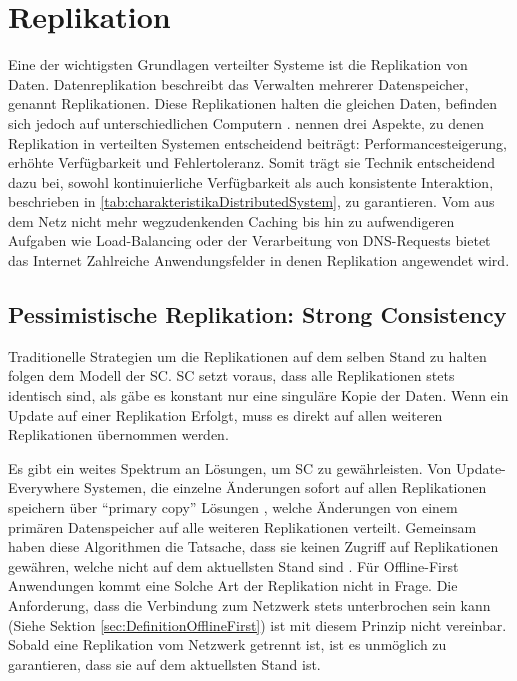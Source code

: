 \documentclass[a4paper, 12pt]{scrreprt}
\begin{document}
\section{Replikation}

Eine der wichtigsten Grundlagen verteilter Systeme ist die Replikation von Daten. Datenreplikation beschreibt das Verwalten mehrerer Datenspeicher, genannt Replikationen. Diese Replikationen halten die gleichen Daten, befinden sich jedoch auf unterschiedlichen Computern \autocite[S.42]{ArticleOptimisticReplication}. \citet{BookDistributedSystemsConceptsAndDesign} nennen drei Aspekte, zu denen Replikation in verteilten Systemen entscheidend beiträgt: Performancesteigerung, erhöhte Verfügbarkeit und Fehlertoleranz. Somit trägt sie Technik entscheidend dazu bei, sowohl kontinuierliche Verfügbarkeit als auch konsistente Interaktion, beschrieben in \ref{tab:charakteristikaDistributedSystem}, zu garantieren. Vom aus dem Netz nicht mehr wegzudenkenden Caching bis hin zu aufwendigeren Aufgaben wie Load-Balancing oder der Verarbeitung von DNS-Requests bietet das Internet Zahlreiche Anwendungsfelder in denen Replikation angewendet wird. 

\subsection{Pessimistische Replikation: Strong Consistency}

Traditionelle Strategien um die Replikationen auf dem selben Stand zu halten folgen dem Modell der \ac{SC}. \ac{SC} setzt voraus, dass alle Replikationen stets identisch sind, als gäbe es konstant nur eine singuläre Kopie der Daten. Wenn ein Update auf einer Replikation Erfolgt, muss es direkt auf allen weiteren Replikationen übernommen werden. 

Es gibt ein weites Spektrum an Lösungen, um \ac{SC} zu gewährleisten. Von {Update-Everywhere} Systemen, die einzelne Änderungen sofort auf allen Replikationen speichern \autocite{ThesisUpdateEverywhere} über \enquote{primary copy} Lösungen \autocite[S.14]{BookPrimaryReplica}, welche Änderungen von einem primären Datenspeicher auf alle weiteren Replikationen verteilt. Gemeinsam haben diese Algorithmen die Tatsache, dass sie keinen Zugriff auf Replikationen gewähren, welche nicht auf dem aktuellsten Stand sind \autocite[S.43]{ArticleOptimisticReplication}. Für Offline-First Anwendungen kommt eine Solche Art der Replikation nicht in Frage. Die Anforderung, dass die Verbindung zum Netzwerk stets unterbrochen sein kann (Siehe Sektion \ref{sec:DefinitionOfflineFirst}) ist mit diesem Prinzip nicht vereinbar. Sobald eine Replikation vom Netzwerk getrennt ist, ist es unmöglich zu garantieren, dass sie auf dem aktuellsten Stand ist.
\end{document}
